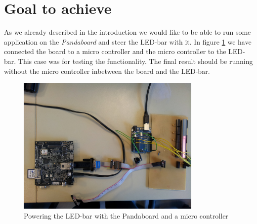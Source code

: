 \section{Goal to achieve}
As we already described in the introduction we would like to be able to run some application on the \textit{Pandaboard} and steer the LED-bar with it. In figure \ref{fig:completeProject} we have connected the board to a micro controller and the micro controller to the LED-bar. This case was for testing the functionality. The final result should be running without the micro controller inbetween the board and the LED-bar.
\begin{figure}[H]
   \centering
   \includegraphics[width=0.8\textwidth]{img/Panda_and_LED_Bar.jpg}%
   \caption{Powering the LED-bar with the Pandaboard and a micro controller}
   \label{fig:completeProject}%
\end{figure}